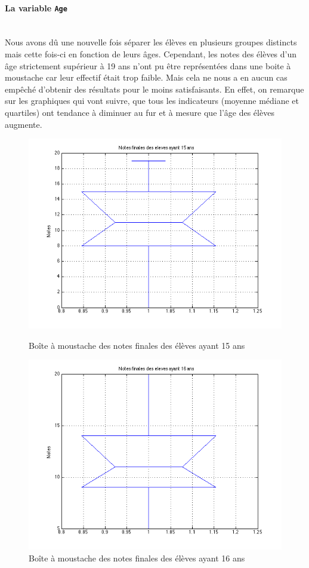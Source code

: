 \documentclass[11pt]{article}
\begin{document}
\paragraph{La variable \texttt{Age}}~\\\indent 
Nous avons dû une nouvelle fois séparer les élèves en plusieurs groupes distincts mais cette fois-ci en fonction de leurs âges. Cependant, les notes des élèves d'un âge strictement supérieur à 19 ans n'ont pu être représentées dans une boite à moustache car leur effectif était trop faible. Mais cela ne nous a en aucun cas empêché d'obtenir des résultats pour le moins satisfaisants. En effet, on remarque sur les graphiques qui vont suivre, que tous les indicateurs (moyenne médiane et quartiles) ont tendance à diminuer au fur et à mesure que l'âge des élèves augmente.

\begin{figure}[h]
\centering
\includegraphics[scale=0.5]{Images/fig40.png}
\caption{Boîte à moustache des notes finales des élèves ayant 15 ans}
\includegraphics[scale=0.5]{Images/fig41.png}
\caption{Boîte à moustache des notes finales des élèves ayant 16 ans}
\end{figure}
\end{document}
